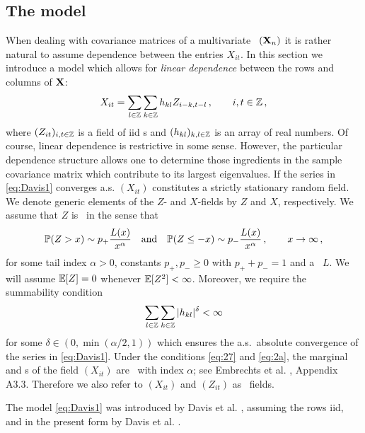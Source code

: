 \subsection{The model}
When dealing with covariance matrices of a multivariate \ts\ $({\mathbf X}_n)$ it is rather natural to assume dependence
between the entries $X_{it}$.
In this section we introduce a model which allows for {\em linear dependence}
between the rows and columns of ${\mathbf X}$:
\begin{equation}\label{eq:Davis1}
X_{it}=\sum_{l\in \mathbb{Z}}\sum_{k\in \mathbb{Z}} h_{kl} Z_{i-k,t-l}\,,\qquad i,t\in\mathbb{Z}\,,
\end{equation}
where $(Z_{it})_{i,t\in \mathbb{Z}}$ is a field of iid \rv s and $(h_{kl})_{k,l\in\mathbb{Z}}$ is an array of real numbers.
Of course, linear dependence is restrictive in some sense. However, the particular dependence structure allows one to
determine those ingredients in the sample covariance matrix which contribute to its largest eigenvalues.
If the series in \eqref{eq:Davis1} converges a.s. $(X_{it})$ constitutes a strictly stationary random field.
We denote generic elements of the $Z$- and $X$-fields by $Z$ and $X$, respectively. We assume that $Z$ is \regvary\ in the sense that
\begin{equation}\label{eq:27}
\mathbb{P}(Z>x)\sim p_+ \dfrac{L(x)}{x^{\alpha}}\quad\mbox{and}\quad  \mathbb{P}(Z\le -x)\sim p_-
\dfrac{L(x)}{x^{\alpha}}\,,\qquad x \to \infty\,,
\end{equation}
for some tail index $\alpha>0$, constants $p_+,p_-\ge 0$ with $p_++p_-=1$ and a \slvary\ $L$. We will assume $\mathbb{E}[ Z]=0$ whenever $\mathbb{E} [Z^2]<\infty$.
Moreover, we require the summability condition
\begin{equation}\label{eq:2a}
\sum_{l \in \mathbb{Z}} \sum_{k\in \mathbb{Z}} |h_{kl}|^{\delta} <\infty
\end{equation}
for some $\delta\in (0,\min({\alpha/2},1))$ which ensures
the a.s.~absolute convergence of the series in \eqref{eq:Davis1}. Under the conditions \eqref{eq:27} and \eqref{eq:2a}, the marginal and
\fidi s of the field $(X_{it})$ are \regvary\ with index $\alpha$; see
Embrechts et al. \cite{embrechts:klueppelberg:mikosch:1997}, Appendix A3.3. Therefore we also refer to $(X_{it})$ and $(Z_{it})$
as \regvary\ fields.
\par
The model \eqref{eq:Davis1} was introduced by Davis et al. \cite{davis:pfaffel:stelzer:2014}, assuming the rows iid, and in the
present form by Davis et al. \cite{davis:mikosch:pfaffel:2016}.
